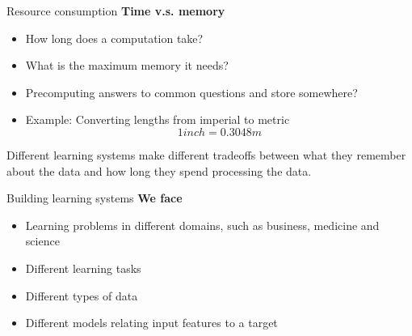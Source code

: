 \documentclass{beamer}
\begin{document}
\begin{frame}{Resource consumption}
\textbf{Time v.s. memory}
\begin{itemize}
\item How long does a computation take?
\item What is the maximum memory it needs?
\item Precomputing answers to common questions and store somewhere?
\item Example: Converting lengths from imperial to metric
$$
1 inch = 0.3048 m
$$
\end{itemize}
\vspace{6pt}
Different learning systems make different tradeoffs between what they remember about the data and how long they spend processing the data. 
\end{frame}

\begin{frame}{Building learning systems}
\textbf{We face}
\begin{itemize}
\item Learning problems in different domains, such as business, medicine and science
\item Different learning tasks
\item Different types of data
\item Different models relating input features to a target
\end{itemize}
\end{frame}
\end{document}
